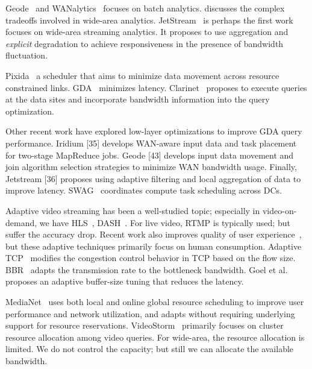  Geode~\cite{vulimiri2015global} and
WANalytics~\cite{wanalytics2015vulimiri} focuses on batch analytics.
\cite{heintz2015towards} discusses the complex tradeoffs involved in wide-area
analytics. JetStream~\cite{rabkin2014aggregation} is perhaps the first work
focuses on wide-area streaming analytics. It proposes to use aggregation and
\textit{explicit} degradation to achieve responsiveness in the presence of
bandwidth fluctuation.

Pixida~\cite{kloudas2015pixida} a scheduler that aims to minimize data movement
across resource constrained links.  GDA~\cite{pu2015low} minimizes latency.
Clarinet~\cite{viswanathan2016clarinet} proposes to execute queries at the data
sites and incorporate bandwidth information into the query optimization.

Other recent work have explored low-layer optimizations to improve GDA query
performance. Iridium [35] develops WAN-aware input data and task placement for
two-stage MapReduce jobs. Geode [43] develops input data movement and join
algorithm selection strategies to minimize WAN bandwidth usage.  Finally,
Jetstream [36] proposes using adaptive filtering and local aggregation of data
to improve latency. SWAG~\cite{hung2015scheduling} coordinates compute task
scheduling across DCs.

 Adaptive video streaming has been a
well-studied topic; especially in video-on-demand, we have
HLS~\cite{pantos2016http}, DASH~\cite{michalos2012dynamic}. For live video, RTMP
is typically used; but suffer the accuracy drop. Recent work also improves
quality of user experience~\cite{yin2015control}, but these adaptive techniques
primarily focus on human consumption. Adaptive TCP~\cite{wu2013adaptive}
modifies the congestion control behavior in TCP based on the flow
size. BBR~\cite{cardwell2017bbr} adapts the transmission rate to the bottleneck
bandwidth. Goel et al.~\cite{goel2008low} proposes an adaptive buffer-size
tuning that reduces the latency.

 MediaNet~\cite{hicks2003user} uses both local
and online global resource scheduling to improve user performance and network
utilization, and adapts without requiring underlying support for resource
reservations. VideoStorm~\cite{zhang2017live} primarily focuses on cluster
resource allocation among video queries. For wide-area, the resource allocation
is limited. We do not control the capacity; but still we can allocate the
available bandwidth.




